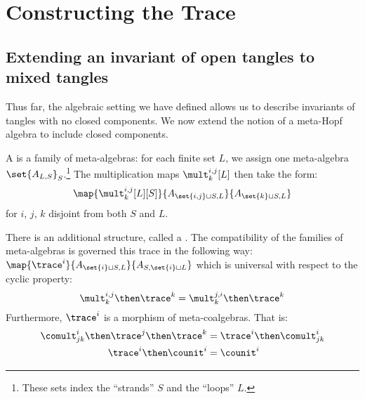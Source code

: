 \chapter{Constructing the Trace}\label{ch:trace}
\section{Extending an invariant of open tangles to mixed tangles}
Thus far, the algebraic setting we have defined allows us to describe invariants
of tangles with no closed components. We now extend the notion of a meta-Hopf
algebra to include closed components.


\begin{definition}
        A  is a family of meta-algebras: for each
        finite set $L$, we assign one meta-algebra $\set{A_{L,
        S}}_S$.\footnote{These sets index the \enquote{strands} $S$ and the
        \enquote{loops} $L$.} The multiplication maps $\mult^{i,j}_k[L]$ then
        take the form:
        \begin{equation}
                \map {\mult^{i,j}_k[L][S]}
                        {A_{\set{i,j}\sqcup S, L}}
                        {A_{\set{k}\sqcup S, L}} 
        \end{equation}
        for $i$, $j$, $k$ disjoint from both $S$ and $L$.

        There is an additional structure, called a . The
        compatibility of the families of meta-algebras is governed this trace in
        the following way:
        $\map {\trace^i} {A_{\set{i}\sqcup S, L}} {A_{S,\set{i}\sqcup L}}$ which
        is universal with respect to the cyclic property:
        \begin{equation}
                \mult^{i,j}_{k}\then\trace^k
                =
                \mult^{j,i}_{k}\then\trace^k
        \end{equation}
        Furthermore, $\trace^i$ is a morphism of meta-coalgebras. That is:
        \begin{align}
                \label{eq:tr_comult}
                \comult^{i}_{jk}\then\trace^j\then\trace^k
                &= \trace^i \then \comult^{i}_{jk}
                \\\label{eq:tr_counit}
                \trace^i \then \counit^i &= \counit^i
        \end{align}
\end{definition}


